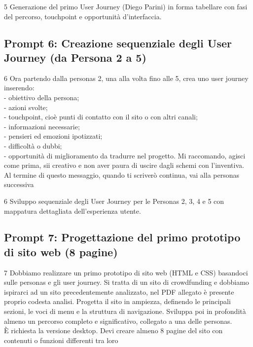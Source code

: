 \documentclass[11pt,a4paper]{article}
\begin{document}
    \begin{respbox}{5}
        Generazione del primo User Journey (Diego Parini) in forma tabellare con fasi del percorso, touchpoint e opportunità d'interfaccia.
    \end{respbox}

    \subsection{Prompt 6: Creazione sequenziale degli User Journey (da Persona 2 a 5)}
    \label{prompt:6}
    \begin{promptbox}{6}
        Ora partendo dalla personas 2, una alla volta fino alle 5, crea uno user journey inserendo:\\
        - obiettivo della persona;\\
        - azioni svolte;\\
        - touchpoint, cioè punti di contatto con il sito o con altri canali;\\
        - informazioni necessarie;\\
        - pensieri ed emozioni ipotizzati;\\
        - difficoltà o dubbi;\\
        - opportunità di miglioramento da tradurre nel progetto. Mi raccomando, agisci come prima, sii creativo e non aver paura di uscire dagli schemi con l'inventiva. Al termine di questo messaggio, quando ti scriverò continua, vai alla personas successiva
    \end{promptbox}

    \begin{respbox}{6}
        Sviluppo sequenziale degli User Journey per le Personas 2, 3, 4 e 5 con mappatura dettagliata dell'esperienza utente.
    \end{respbox}

    \subsection{Prompt 7: Progettazione del primo prototipo di sito web (8 pagine)}
    \label{prompt:7}
    \begin{promptbox}{7}
        Dobbiamo realizzare un primo prototipo di sito web (HTML e CSS) basandoci sulle personas e gli user journey. Si tratta di un sito di crowdfunding e dobbiamo ispirarci ad un sito precedentemente analizzato, nel PDF allegato è presente proprio codesta analisi. Progetta il sito in ampiezza, definendo le principali sezioni, le voci di menu e la struttura di navigazione. Sviluppa poi in profondità almeno un percorso completo e significativo, collegato a una delle personas.\\
        È richiesta la versione desktop. Devi creare almeno 8 pagine del sito con contenuti o funzioni differenti tra loro
    \end{promptbox}
\end{document}
